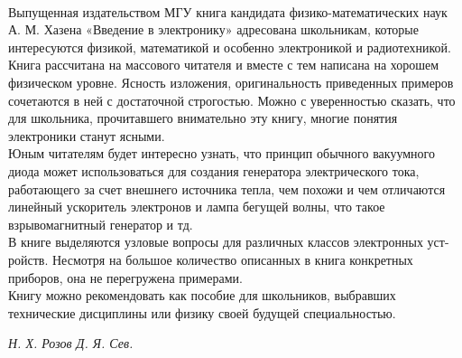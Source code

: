 \documentclass[a4paper,12pt]{article}
\begin{document}
\begin{multicols}{3}
\\Выпущенная издательством МГУ книга кандидата
физико-математических наук А. М. Хазена «Введение в электронику» адресована школьникам, которые интересуются физикой, математикой и особенно электроникой и радиотехникой.
\\Книга рассчитана на массового читателя и вместе с тем написана на хорошем физическом уровне. Ясность изложения, оригинальность приведенных примеров сочетаются в ней с достаточной строгостью. Можно с уверенностью сказать, что для школьника, прочитавшего внимательно эту книгу, многие понятия электроники станут ясными.
\\Юным читателям будет
интересно узнать, что принцип обычного вакуумного диода может использоваться для создания генератора электрического тока, работающего за счет внешнего источника тепла, чем похожи и чем отличаются линейный ускоритель электронов и лампа бегущей волны, что такое взрывомагнитный генератор и тд.
\\ В книге выделяются узловые вопросы для различных классов электронных уст-
ройств. Несмотря на большое количество описанных в книга конкретных приборов, она не перегружена примерами.
\\ Книгу можно рекомендовать как пособие для школьников, выбравших технические дисциплины или физику своей будущей специальностью.

\vfill %
\end{multicols}
\hfill \textit{Н. Х. Розов \hspace{2cm} Д. Я. Сев.}
\vspace{1cm}
\end{document}
